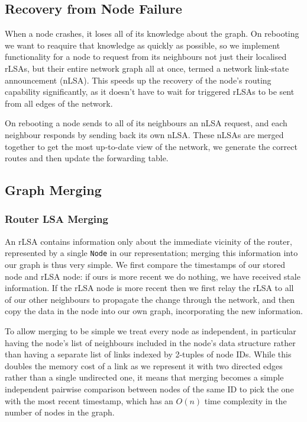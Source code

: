 \documentclass[withindex,glossary,openany]{cam-thesis}
\begin{document}
\subsection{Recovery from Node Failure}
\label{subsec:node_failure}

When a node crashes, it loses all of its knowledge about the graph. On rebooting we want to reaquire that knowledge as quickly as possible, so we implement functionality for a node to request from its neighbours not just their localised rLSAs, but their entire network graph all at once, termed a network link-state announcement (nLSA). This speeds up the recovery of the node's routing capability significantly, as it doesn't have to wait for triggered rLSAs to be sent from all edges of the network.

On rebooting a node sends to all of its neighbours an nLSA request, and each neighbour responds by sending back its own nLSA. These nLSAs are merged together to get the most up-to-date view of the network, we generate the correct routes and then update the forwarding table.

\subsection{Graph Merging}

\subsubsection{Router LSA Merging}

An rLSA contains information only about the immediate vicinity of the router, represented by a single \texttt{Node} in our representation; merging this information into our graph is thus very simple. We first compare the timestamps of our stored node and rLSA node: if ours is more recent we do nothing, we have received stale information. If the rLSA node is more recent then we first relay the rLSA to all of our other neighbours to propagate the change through the network, and then copy the data in the node into our own graph, incorporating the new information.

To allow merging to be simple we treat every node as independent, in particular having the node's list of neighbours included in the node's data structure rather than having a separate list of links indexed by 2-tuples of node IDs. While this doubles the memory cost of a link as we represent it with two directed edges rather than a single undirected one, it means that merging becomes a simple independent pairwise comparison between nodes of the same ID to pick the one with the most recent timestamp, which has an $O(n)$ time complexity in the number of nodes in the graph.
\end{document}
